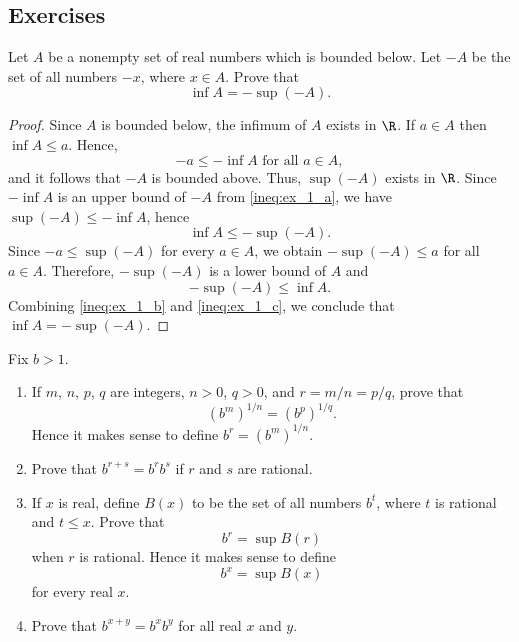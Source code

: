 \subsection*{Exercises}
\begin{exercise}
Let $A$ be a nonempty set of real numbers which is bounded below.
Let $-A$ be the set of all numbers $-x$, where $x \in A$.
Prove that \[\inf A = -\sup (-A).\]
\end{exercise}
\begin{proof}
Since $A$ is bounded below, the infimum of $A$ exists in $\R$. 
If $a \in A$ then $\inf A \leq a$. Hence,
\begin{equation}\label{ineq:ex_1_a}
-a \leq -\inf A \text{ for all } a \in A,
\end{equation}
and it follows that $-A$ is bounded above. Thus, $\sup (-A)$ exists in $\R$.
Since $- \inf A$ is an upper bound of $-A$ from \eqref{ineq:ex_1_a}, we have $\sup (-A) \leq -\inf A$, hence 
\begin{equation}\label{ineq:ex_1_b}
\inf A \leq -\sup(-A).
\end{equation}
Since $-a \leq \sup(-A)$ for every $a \in A$, we obtain $-\sup (-A) \leq a$ for all $a \in A$.
Therefore, $-\sup(-A)$ is a lower bound of $A$ and 
\begin{equation}\label{ineq:ex_1_c}
-\sup(-A) \leq  \inf A.
\end{equation}
Combining \eqref{ineq:ex_1_b} and \eqref{ineq:ex_1_c}, we conclude that $\inf A = -\sup (-A)$.
\end{proof}
\begin{exercise}
Fix $b>1$.
\begin{enumerate}
\item[(a)] If $m$, $n$, $p$, $q$ are integers, $n>0$, $q>0$, and $r=m/n=p/q$, prove that 
 \[
 (b^m)^{1/n}=(b^p)^{1/q}.
 \]
 Hence it makes sense to define $b^r = (b^m)^{1/n}$.
 \item[(b)] Prove that $b^{r+s} = b^r b^s$ if $r$ and $s$ are rational.
 \item[(c)] If $x$ is real, define $B(x)$ to be the set of all numbers $b^t$, where $t$ is rational and $t \leq x$. 
Prove that \[b^r = \sup B(r)\] when $r$ is rational.
Hence it makes sense to define \[b^x = \sup B(x)\] for every real $x$.
\item[(d)] Prove that $b^{x+y}=b^xb^y$ for all real $x$ and $y$.
\end{enumerate}
\end{exercise}
